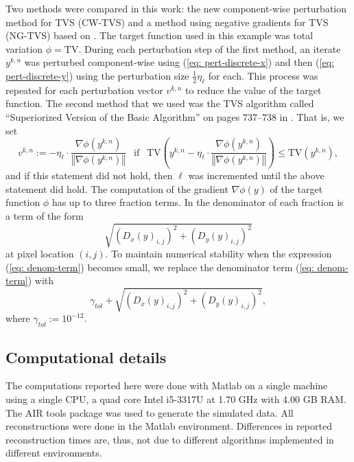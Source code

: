 \documentclass[smallextended]{svjour3}      %
\begin{document}
Two methods were compared in this work: the new component-wise perturbation method for TVS (CW-TVS) and a method using negative gradients for TVS (NG-TVS) based on \cite[pp. 737--738]{censor2014projectedsubgrad}. The target function used in this example was total variation $\phi=\mbox{TV}$. During each perturbation step of the first method, an iterate $y^{k,n}$ was perturbed component-wise using (\ref{eq: pert-discrete-x}) and then (\ref{eq: pert-discrete-y}) using the perturbation size $\frac{1}{2}\eta_{\ell}$ for each. This process was repeated for each perturbation vector $v^{k,n}$ to reduce the value of the target function. The second method that we used was the TVS algorithm called ``Superiorized Version of the Basic Algorithm'' on pages 737--738 in \cite{censor2014projectedsubgrad}. That is, we set
\begin{equation}
v^{k,n}:=-\eta_{\ell}\cdot\dfrac{\nabla\phi\left(y^{k,n}\right)}{\left\Vert \nabla\phi\left(y^{k,n}\right)\right\Vert }\:\:\mbox{ if }\:\:\mbox{TV}\left(y^{k,n}-\eta_{\ell}\cdot\dfrac{\nabla\phi\left(y^{k,n}\right)}{\left\Vert \nabla\phi\left(y^{k,n}\right)\right\Vert }\right)\leq\mbox{TV}\left(y^{k,n}\right),\label{eq: neg-grad-method}
\end{equation}
and if this statement did not hold, then $\ell$ was incremented until the above statement did hold. The computation of the gradient $\nabla\phi\left(y\right)$ of the target function $\phi$ has up to three fraction terms. In the denominator of each fraction is a term of the form
\begin{equation}
\sqrt{\left(D_{x}(y)_{i,j}\right)^{2}+\left(D_{y}(y)_{i,j}\right)^{2}}\label{eq: denom-term}
\end{equation}
at pixel location $(i,j)$. To maintain numerical stability when the expression (\ref{eq: denom-term}) becomes small, we replace the denominator term (\ref{eq: denom-term}) with
\begin{equation}
\gamma_{tol}+\sqrt{\left(D_{x}(y)_{i,j}\right)^{2}+\left(D_{y}(y)_{i,j}\right)^{2}},
\end{equation}
where $\gamma_{tol}:=10^{-12}$.

\subsection{Computational details}

The computations reported here were done with Matlab \cite{MATLAB} on a single machine using a single CPU, a quad core Intel i5-3317U at 1.70 GHz with 4.00 GB RAM. The AIR tools package \cite{Hansen2012airtools} was used to generate the simulated data. All reconstructions were done in the Matlab environment. Differences in reported reconstruction times are, thus, not due to different algorithms implemented in different environments.
\end{document}
